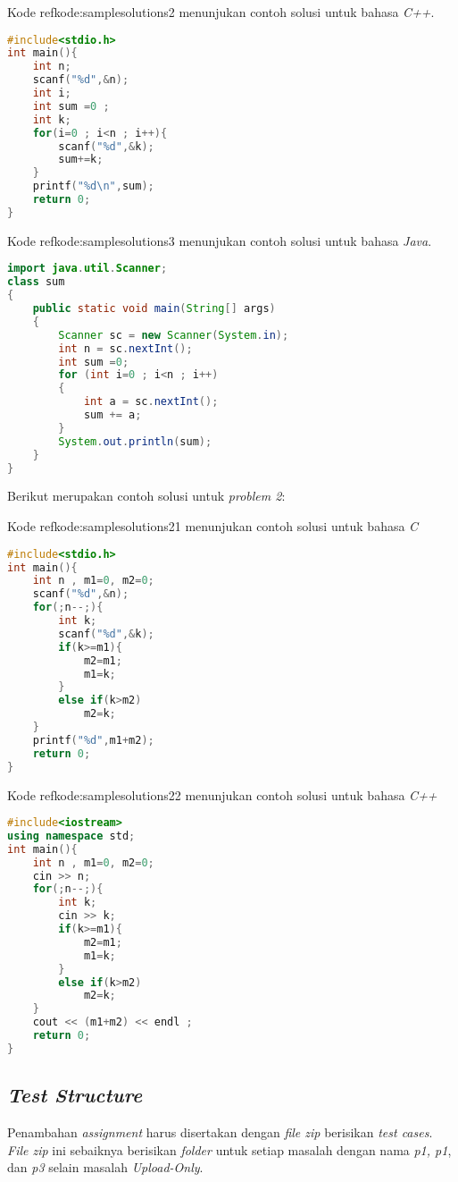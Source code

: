 Kode ref{kode:samplesolutions2} menunjukan contoh solusi untuk bahasa \textit{C++}.
\begin{lstlisting}[language=C++, caption=Contoh solusi \textit{problem} 1 bahasa \textit{C++}, label=kode:samplesolutions2]
#include<stdio.h>
int main(){
	int n;
	scanf("%d",&n);
	int i;
	int sum =0 ;
	int k;
	for(i=0 ; i<n ; i++){
		scanf("%d",&k);
		sum+=k;
	}
	printf("%d\n",sum);
	return 0;
}
\end{lstlisting}

Kode ref{kode:samplesolutions3} menunjukan contoh solusi untuk bahasa \textit{Java}.
\begin{lstlisting}[language=Java,  caption=Contoh solusi \textit{problem} 1 bahasa \textit{Java} label=kode:samplesolutions3]
import java.util.Scanner;
class sum
{
	public static void main(String[] args)
	{ 
		Scanner sc = new Scanner(System.in);
		int n = sc.nextInt();
		int sum =0;
		for (int i=0 ; i<n ; i++)
		{
			int a = sc.nextInt();
			sum += a;
		}
		System.out.println(sum); 
	}
}
\end{lstlisting}

Berikut merupakan contoh solusi untuk \textit{problem 2}:

Kode ref{kode:samplesolutions21} menunjukan contoh solusi untuk bahasa \textit{C}
\begin{lstlisting}[language=C, caption=Contoh solusi \textit{problem} 2 bahasa \textit{C}, label=kode:samplesolutions21]
#include<stdio.h>
int main(){
	int n , m1=0, m2=0;
	scanf("%d",&n);
	for(;n--;){
		int k;
		scanf("%d",&k);
		if(k>=m1){
			m2=m1;
			m1=k;
		}
		else if(k>m2)
			m2=k;
	}
	printf("%d",m1+m2);
	return 0;
}
\end{lstlisting}

Kode ref{kode:samplesolutions22} menunjukan contoh solusi untuk bahasa \textit{C++}
\begin{lstlisting}[language=C++, caption=Contoh solusi \textit{problem} 2 bahasa \textit{C++}, label=kode:samplesolutions22]
#include<iostream>
using namespace std;
int main(){
	int n , m1=0, m2=0;
	cin >> n;
	for(;n--;){
		int k;
		cin >> k;
		if(k>=m1){
			m2=m1;
			m1=k;
		}
		else if(k>m2)
			m2=k;
	}
	cout << (m1+m2) << endl ;
	return 0;
}
\end{lstlisting}

\subsection{\textit{Test Structure}}
\label{subsec:testStructure}
Penambahan \textit{assignment} harus disertakan dengan \textit{file zip} berisikan \textit{test cases}. \textit{File zip} ini sebaiknya berisikan \textit{folder} untuk setiap masalah dengan nama \textit{p1, p1}, dan \textit{p3} selain masalah \textit{Upload-Only}.

